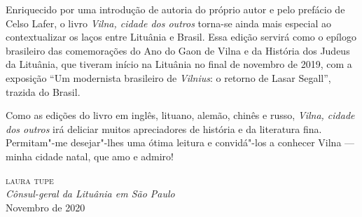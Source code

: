 
Enriquecido por uma introdução de autoria do próprio autor e pelo 
prefácio de Celso Lafer, o livro \textit{Vilna, cidade
dos outros} torna-se ainda mais especial ao contextualizar 
os laços entre Lituânia e Brasil. Essa edição servirá como o epílogo 
brasileiro das comemorações do Ano do Gaon de Vilna e da História dos Judeus da Lituânia, que
tiveram início na Lituânia no final de novembro de 2019, com a exposição
``Um modernista brasileiro de \textit{Vilnius}: o retorno de
Lasar Segall'', trazida do Brasil.

Como as edições do livro em inglês, lituano, alemão,
chinês e russo, \textit{Vilna, cidade dos outros} irá deliciar muitos
apreciadores de história e da literatura fina. Permitam"-me desejar"-lhes
uma ótima leitura e convidá"-los a conhecer Vilna --- minha cidade natal,
que amo e admiro!

\begin{flushright}
\textsc{laura tupe}\\
\textit{Cônsul-geral da Lituânia em São Paulo}\\
\medskip
Novembro de 2020
\end{flushright}